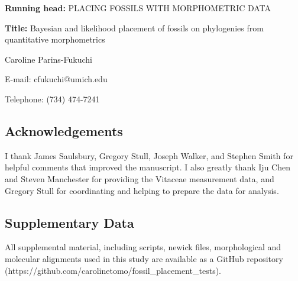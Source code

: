 \documentclass[12pt]{article}
\begin{document}
\setcounter{page}{1}

\noindent \textbf{Running head:} PLACING FOSSILS WITH MORPHOMETRIC DATA

\noindent \textbf{Title:} Bayesian and likelihood placement of fossils on phylogenies from quantitative morphometrics

\noindent Caroline Parins-Fukuchi


\noindent E-mail: cfukuchi@umich.edu

\noindent Telephone: (734) 474-7241

\medskip


\newpage


\subsection*{Acknowledgements}
I  thank James Saulsbury, Gregory Stull, Joseph Walker, and Stephen Smith for helpful comments that improved the manuscript. I also greatly thank Iju Chen and Steven Manchester for providing the Vitaceae measurement data, and Gregory Stull for coordinating and helping to prepare the data for analysis.

\subsection*{Supplementary Data}
All supplemental material, including scripts, newick files, morphological and molecular alignments used in this study are available as a GitHub repository (https://github.com/carolinetomo/fossil\_placement\_tests). 	
\end{document}

